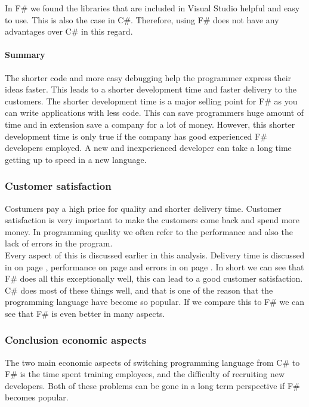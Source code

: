 \documentclass[12pt, a4paper]{article}
\begin{document}
In F\# we found the libraries that are included in Visual Studio helpful and easy to use. This is also the case in C\#. Therefore, using F\# does not have any advantages over C\# in this regard. 

\paragraph{Summary}
The shorter code and more easy debugging help the programmer express their ideas faster. This leads to a shorter development time and faster delivery to the customers. The shorter development time is a major selling point for F\# as you can write applications with less code. This can save programmers huge amount of time and in extension save a company for a lot of money. However, this shorter development time is only true if the company has good experienced F\# developers employed. A new and inexperienced developer can take a long time getting up to speed in a new language.

\newpage
\subsubsection{Customer satisfaction}
Costumers pay a high price for quality and shorter delivery time. Customer satisfaction is very important to make the customers come back and spend more money. In programming quality we often refer to the performance and also the lack of errors in the program.\\

Every aspect of this is discussed earlier in this analysis. Delivery time is discussed in  on page \pageref{developmentTime}, performance on page \pageref{AnalysisPerformance} and errors in  on page \pageref{debug}. In short we can see that F\# does all this exceptionally well, this can lead to a good customer satisfaction.\\

C\# does most of these things well, and that is one of the reason that the programming language have become so popular. If we compare this to F\# we can see that F\# is even better in many aspects.

\newpage
\subsubsection{Conclusion economic aspects}
The two main economic aspects of switching programming language from C\# to F\# is the time spent training employees, and the difficulty of recruiting new developers. Both of these problems can be gone in a long term perspective if F\# becomes popular.\\
\end{document}

